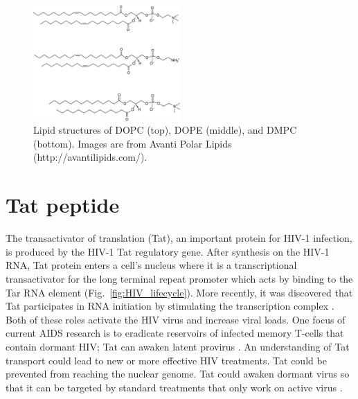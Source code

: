 \begin{figure}[htbp]
  \centering
  \includegraphics[width=0.5\textwidth]{figures/lipid_structure}
  \caption[Lipid structures of DOPC (top), DOPE (middle),
  and DMPC (bottom)]
  {Lipid structures of DOPC (top), DOPE (middle),
  and DMPC (bottom). Images are from Avanti Polar Lipids (http://avantilipids.com/).}
  \label{fig:lipid_structure}
\end{figure}

\section{Tat peptide}\label{sec:Tat_peptide}
The transactivator of translation (\gls{Tat}),
an important protein for HIV-1 infection,
is produced by the HIV-1 Tat regulatory gene.
After synthesis on the HIV-1 RNA, Tat protein enters a cell's nucleus where it is a
transcriptional transactivator for the long terminal repeat
promoter which acts by binding to the Tar RNA element \cite{Vaishnav91}
(Fig.~\ref{fig:HIV_lifecycle}).
More recently, it was discovered that Tat participates in RNA
initiation by stimulating the transcription complex \cite{Raha05}.
Both of these roles activate the HIV virus and increase viral loads.
One focus of current AIDS research is to eradicate reservoirs of 
infected memory T-cells that contain dormant HIV;
Tat can awaken latent provirus \cite{Macias09}.
An understanding of Tat transport could lead to new or more effective 
HIV treatments. Tat could be prevented from
reaching the nuclear genome. Tat could awaken dormant virus so that
it can be targeted by standard treatments that only
work on active virus \cite{Macias09}. 

